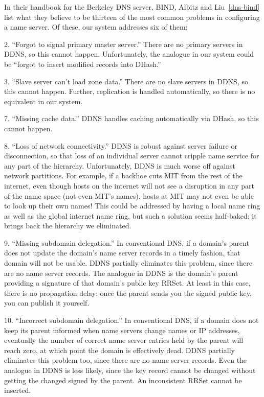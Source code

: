 In their handbook for the Berkeley DNS server, BIND,
Albitz and Liu~\ref{dns-bind} list what they believe to be
thirteen of the most common problems in configuring
a name server.
Of these, our system addresses six of them:
\begin{list}{}{}
\item[2.] ``Forgot to signal primary master server.''
There are no primary servers in DDNS, so this cannot happen.
Unfortunately, the analogue in our system could be ``forgot to
insert modified records into DHash.''
\item[3.] ``Slave server can't load zone data.''
There are no slave servers in DDNS, so this cannot happen.
Further, replication is handled automatically, so there is no
equivalent in our system.
\item[7.] ``Missing cache data.''
DDNS handles caching automatically via DHash, so this cannot happen.
\item[8.] ``Loss of network connectivity.''
DDNS is robust against server failure or disconnection, so that loss of
an individual server cannot cripple name service for any part of the
hierarchy.
Unfortunately, DDNS is much worse off against network partitions.
For example, if a backhoe cuts MIT from the rest of the internet,
even though hosts on the internet will not see a disruption in any
part of the name space (not even MIT's names), hosts at MIT
may not even be able to look up their own names!
This could be addressed by having a local name ring as well
as the global internet name ring, but such a solution seems half-baked:
it brings back the hierarchy we eliminated.
\item[9.] ``Missing subdomain delegation.''
In conventional DNS, if a domain's parent does not
update the domain's name server records in a timely fashion,
that domain will not be usable.  
DDNS partially eliminates this problem, since there are no name server records.
The analogue in DDNS is the domain's parent providing a signature
of that domain's public key RRSet.
At least in this case, there is no propagation delay: once the
parent sends you the signed public key, you can publish it yourself.
\item[10.] ``Incorrect subdomain delegation.''
In conventional DNS, if a domain does not keep its parent informed
when name servers change names or IP addresses, eventually 
the number of correct name server entries held by the parent
will reach zero, at which point the domain is effectively dead.
DDNS partially eliminates this problem too, since there are no name server records.
Even the analogue in DDNS is less likely, since the key record
cannot be changed without getting the changed signed by the parent.
An inconsistent RRSet cannot be inserted.
\end{list}

